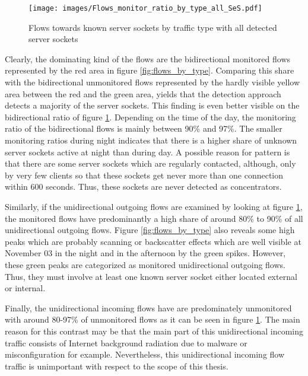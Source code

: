\begin{figure}[h]
	\centering
	\texttt{[image: images/Flows\_monitor\_ratio\_by\_type\_all\_SeS.pdf]}
	\caption{Flows towards known server sockets by traffic type with all detected server sockets}
	\label{fig:monitored_flows_by_type}
\end{figure}

Clearly, the dominating kind of the flows are the bidirectional monitored flows represented by the red area in figure \ref{fig:flows_by_type}. 
Comparing this share with the bidirectional unmonitored flows represented by the hardly visible yellow area between the red and the green area, yields that the detection approach detects a majority of the \glspl{server socket}.
This finding is even better visible on the bidirectional ratio of figure \ref{fig:monitored_flows_by_type}.
Depending on the time of the day, the monitoring ratio of the bidirectional flows is mainly between 90\% and 97\%.
The smaller monitoring ratios during night indicates that there is a higher share of unknown \glspl{server socket} active at night than during day.
A possible reason for pattern is that there are some \glspl{server socket} which are regularly contacted, although, only by very few clients so that these sockets get never more than one connection within 600 seconds. 
Thus, these sockets are never detected as concentrators.

Similarly, if the unidirectional outgoing flows are examined by looking at figure \ref{fig:monitored_flows_by_type}, the monitored flows have predominantly a high share of around 80\% to 90\% of all unidirectional outgoing flows. 
Figure \ref{fig:flows_by_type} also reveals some high peaks which are probably scanning or backscatter effects which are well visible at November 03 in the night and in the afternoon by the green spikes. 
However, these green peaks are categorized as monitored unidirectional outgoing flows. 
Thus, they must involve at least one known \gls{server socket} either located external or internal.

Finally, the unidirectional incoming flows have are predominately unmonitored with around 80-97\% of unmonitored flows as it can be seen in figure \ref{fig:monitored_flows_by_type}. 
The main reason for this contrast may be that the main part of this unidirectional incoming traffic consists of Internet background radiation \citep{Wustrow10,Pang04} due to malware or misconfiguration for example. 
Nevertheless, this unidirectional incoming flow traffic is unimportant with respect to the scope of this thesis.

